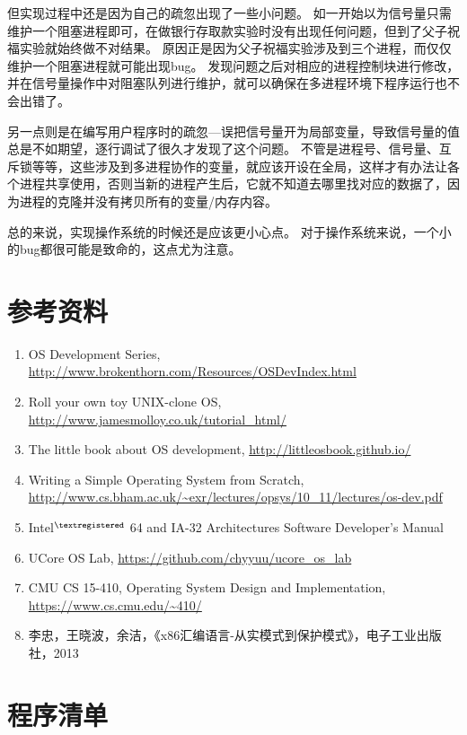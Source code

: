 \documentclass[logo,reportComp]{thesis}
\begin{document}
但实现过程中还是因为自己的疏忽出现了一些小问题。
如一开始以为信号量只需维护一个阻塞进程即可，在做银行存取款实验时没有出现任何问题，但到了父子祝福实验就始终做不对结果。
原因正是因为父子祝福实验涉及到三个进程，而仅仅维护一个阻塞进程就可能出现bug。
发现问题之后对相应的进程控制块进行修改，并在信号量操作中对阻塞队列进行维护，就可以确保在多进程环境下程序运行也不会出错了。

另一点则是在编写用户程序时的疏忽---误把信号量开为局部变量，导致信号量的值总是不如期望，逐行调试了很久才发现了这个问题。
不管是进程号、信号量、互斥锁等等，这些涉及到多进程协作的变量，就应该开设在全局，这样才有办法让各个进程共享使用，否则当新的进程产生后，它就不知道去哪里找对应的数据了，因为进程的克隆并没有拷贝所有的变量/内存内容。

总的来说，实现操作系统的时候还是应该更小心点。
对于操作系统来说，一个小的bug都很可能是致命的，这点尤为注意。

\section{参考资料}
\begin{enumerate}
	\item OS Development Series, \url{http://www.brokenthorn.com/Resources/OSDevIndex.html}
	\item Roll your own toy UNIX-clone OS, \url{http://www.jamesmolloy.co.uk/tutorial_html/}
	\item The little book about OS development, \url{http://littleosbook.github.io/}
	\item Writing a Simple Operating System from Scratch, \url{http://www.cs.bham.ac.uk/~exr/lectures/opsys/10_11/lectures/os-dev.pdf}
	\item Intel$^{\textregistered}$ 64 and IA-32 Architectures Software Developer's Manual
	\item UCore OS Lab, \url{https://github.com/chyyuu/ucore_os_lab}
	\item CMU CS 15-410, Operating System Design and Implementation, \url{https://www.cs.cmu.edu/~410/}
	\item 李忠，王晓波，余洁，《x86汇编语言-从实模式到保护模式》，电子工业出版社，2013
\end{enumerate}

\appendix
\appendixconfig
\section{程序清单}
\end{document}

